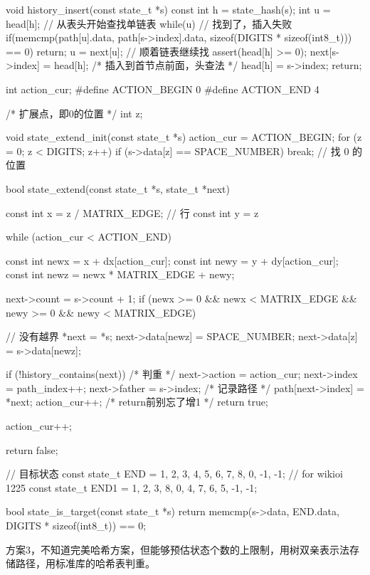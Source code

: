 \begin{Codex}[label=eight_digits_bfs2.c]
void history_insert(const state_t *s) {
    const int h = state_hash(s);
    int u = head[h]; // 从表头开始查找单链表
    while(u) {
        // 找到了，插入失败
        if(memcmp(path[u].data, path[s->index].data,
                sizeof(DIGITS * sizeof(int8_t))) == 0) return;
        u = next[u]; // 顺着链表继续找
    }
    assert(head[h] >= 0);
    next[s->index] = head[h];  /* 插入到首节点前面，头查法 */
    head[h] = s->index;
    return;
}

int action_cur;
#define ACTION_BEGIN 0
#define ACTION_END 4

/* 扩展点，即0的位置 */
int z;

void state_extend_init(const state_t *s) {
    action_cur = ACTION_BEGIN;
    for (z = 0; z < DIGITS; z++) {
        if (s->data[z] == SPACE_NUMBER) {
            break;  // 找 0 的位置
        }
    }
}

bool state_extend(const state_t *s, state_t *next) {
    const int x = z / MATRIX_EDGE; // 行
    const int y = z %

    while (action_cur < ACTION_END) {
        const int newx = x + dx[action_cur];
        const int newy = y + dy[action_cur];
        const int newz = newx * MATRIX_EDGE + newy;

        next->count = s->count + 1;
        if (newx >= 0 && newx < MATRIX_EDGE && newy >= 0 &&
                newy < MATRIX_EDGE) { // 没有越界
            *next = *s;
            next->data[newz] = SPACE_NUMBER;
            next->data[z] = s->data[newz];

            if (!history_contains(next)) { /* 判重 */
                next->action = action_cur;
                next->index = path_index++;
                next->father = s->index;
                /* 记录路径 */
                path[next->index] = *next;
                action_cur++; /* return前别忘了增1 */
                return true;
            }
        }
        action_cur++;
    }
    return false;
}

// 目标状态
const state_t END = {{1, 2, 3, 4, 5, 6, 7, 8, 0}, -1, -1};
// for wikioi 1225
const state_t END1 = {{1, 2, 3, 8, 0, 4, 7, 6, 5}, -1, -1};

bool state_is_target(const state_t *s) {
    return memcmp(s->data, END.data, DIGITS * sizeof(int8_t)) == 0;
}
\end{Codex}

方案3，不知道完美哈希方案，但能够预估状态个数的上限制，用树双亲表示法存储路径，用标准库的哈希表判重。

